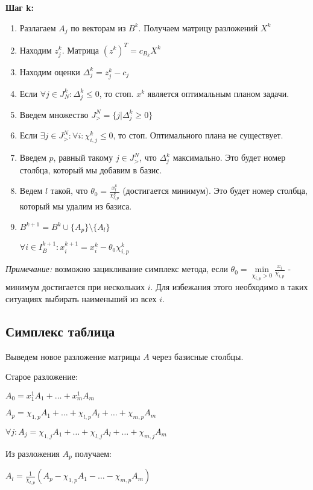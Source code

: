 \documentclass[11pt]{article}
\begin{document}
\begin{sloppypar}
\textbf{Шаг k:}
\begin{enumerate}
  \item Разлагаем $A_j$ по векторам из $B^k$. Получаем матрицу разложений $X^k$
  \item Находим $z^k_j$. Матрица $(z^k)^T = c_{B_k} X^k$
  \item Находим оценки $\Delta^k_j = z^k_j - c_j$
  \item Если $\forall j \in J^k_N: \Delta^k_j \leq 0$, то стоп. $x^k$ является оптимальным планом задачи.
  \item Введем множество $J^N_> = \{j|\Delta^k_j \geq 0\}$
  \item Если $\exists j \in J^N_>: \forall i: \chi^k_{i, j} \leq 0$, то стоп. Оптимального плана не существует.
  \item Введем $p$, равный такому $j \in J^N_>$, что $\Delta^k_j$ максимально. Это будет номер столбца, который мы добавим в базис.
  \item Ведем $l$ такой, что $\theta_0 = \frac{x^k_l}{\chi^k_{l, p}}$ (достигается минимум). Это будет номер столбца, который мы удалим из базиса.
  \item $B^{k + 1} = B^k \cup \{A_p\} \setminus \{A_l\}$
  
  $\forall i \in I^{k+1}_B: x^{k+1}_i = x^k_i - \theta_0 \chi^k_{i, p}$
\end{enumerate}

\textit{Примечание:} возможно зацикливание симплекс метода, если $\theta_0 = \min\limits_{\chi_{i, p} > 0} \frac{x_i}{\chi_{i, p}}$ - минимум достигается при нескольких $i$. Для избежания этого необходимо в таких ситуациях выбирать наименьший из всех $i$. 

\subsection*{Симплекс таблица}

Выведем новое разложение матрицы $A$ через базисные столбцы.

Старое разложение:

$A_0 = x^1_1 A_1 + \dots + x^1_m A_m$

$A_p = \chi_{1, p} A_1 + \dots + \chi_{l, p} A_l + \dots + \chi_{m, p} A_m$

$\forall j: A_j = \chi_{1, j} A_1 + \dots + \chi_{l, j} A_l + \dots + \chi_{m, j} A_m$

Из разложения $A_p$ получаем:

$A_l = \frac{1}{\chi_{l, p}}(A_p -  \chi_{1, p}A_1 - \dots - \chi_{m, p}A_m)$


\end{sloppypar}
\end{document}
